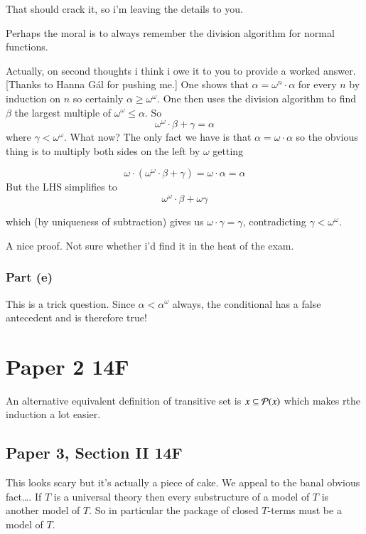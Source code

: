 \documentclass{book}
\begin{document}
That should crack it, so i'm leaving the details to you.

Perhaps the moral is to always remember the division algorithm for normal functions.

\medskip

Actually, on second thoughts i think i owe it to you to provide a
worked answer.  [Thanks to Hanna G\'al for pushing me.] One shows that $\alpha = \omega^n\cdot\alpha$ for
every $n$ by induction on $n$ so certainly $\alpha \geq
\omega^\omega$.  One then uses the division algorithm to find $\beta$
the largest multiple of $\omega^\omega \leq \alpha$.  So
$$\omega^\omega\cdot \beta + \gamma = \alpha$$
where $\gamma < \omega^\omega$.  What now?  The only fact we have is that $\alpha =
\omega\cdot\alpha$ so the obvious thing is to multiply both sides on
the left by $\omega$ getting

$$\omega \cdot (\omega^\omega\cdot \beta + \gamma) = \omega\cdot \alpha = \alpha$$
But the LHS simplifies to
$$\omega^\omega\cdot \beta + \omega\gamma$$

which (by uniqueness of subtraction) gives us $\omega\cdot \gamma = \gamma$, contradicting $\gamma < \omega^\omega$.

\smallskip

A nice proof.  Not sure whether i'd find it in the heat of the exam.


\subsubsection*{Part (e)}
This is a trick question.  Since $\alpha < \alpha^\omega$ always, the 
conditional has a false antecedent and is therefore true!

\section*{Paper 2 14F}

An alternative equivalent definition of transitive set is $x \subseteq {\cal P}(x)$ which makes rthe induction a lot easier.


\subsection*{Paper 3, Section II 14F}

This looks scary but it's actually a piece of cake.  We appeal to the
banal obvious fact\ldots.  If $T$ is a universal theory then every
substructure of a model of $T$ is another model of $T$.  So in
particular the package of closed $T$-terms must be a model of $T$.
\end{document}
